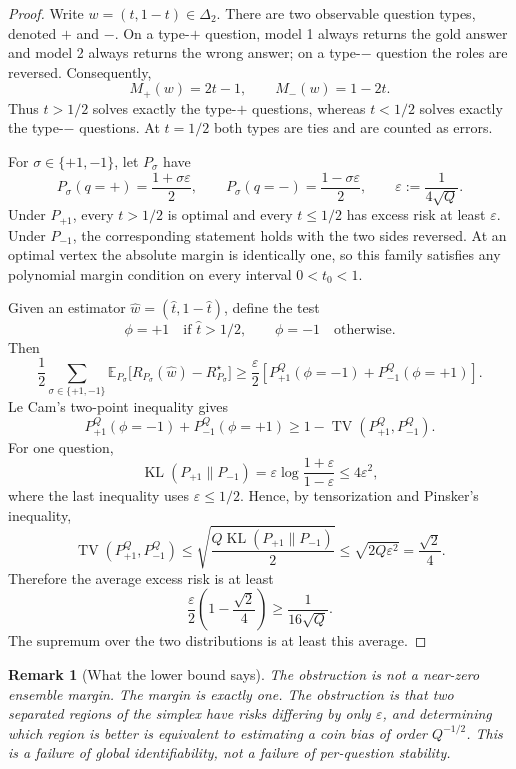 \documentclass[11pt]{article}
\newtheorem{remark}{Remark}
\newcommand{\E}{\mathbb E}
\begin{document}
\begin{proof}
Write $w=(t,1-t)\in\Delta_2$.  There are two observable question types, denoted $+$ and $-$.  On a type-$+$ question, model 1 always returns the gold answer and model 2 always returns the wrong answer; on a type-$-$ question the roles are reversed.  Consequently,
\[
M_+(w)=2t-1,
\qquad
M_-(w)=1-2t.
\]
Thus $t>1/2$ solves exactly the type-$+$ questions, whereas $t<1/2$ solves exactly the type-$-$ questions.  At $t=1/2$ both types are ties and are counted as errors.

For $\sigma\in\{+1,-1\}$, let $P_\sigma$ have
\[
P_\sigma(q=+)=\frac{1+\sigma\varepsilon}{2},
\qquad
P_\sigma(q=-)=\frac{1-\sigma\varepsilon}{2},
\qquad
\varepsilon:=\frac{1}{4\sqrt Q}.
\]
Under $P_{+1}$, every $t>1/2$ is optimal and every $t\le1/2$ has excess risk at least $\varepsilon$.  Under $P_{-1}$, the corresponding statement holds with the two sides reversed.  At an optimal vertex the absolute margin is identically one, so this family satisfies any polynomial margin condition on every interval $0<t_0<1$.

Given an estimator $\widehat w=(\widehat t,1-\widehat t)$, define the test
\[
\phi=+1\quad\text{if }\widehat t>1/2,
\qquad
\phi=-1\quad\text{otherwise}.
\]
Then
\[
\frac12\sum_{\sigma\in\{+1,-1\}}
\E_{P_\sigma}\big[R_{P_\sigma}(\widehat w)-R_{P_\sigma}^\star\big]
\ge
\frac{\varepsilon}{2}
\left
[
P_{+1}^{Q}(\phi=-1)+P_{-1}^{Q}(\phi=+1)
\right].
\]
Le Cam's two-point inequality gives
\[
P_{+1}^{Q}(\phi=-1)+P_{-1}^{Q}(\phi=+1)
\ge
1-\operatorname{TV}(P_{+1}^{Q},P_{-1}^{Q}).
\]
For one question,
\[
\operatorname{KL}(P_{+1}\|P_{-1})
=
\varepsilon\log\frac{1+\varepsilon}{1-\varepsilon}
\le 4\varepsilon^2,
\]
where the last inequality uses $\varepsilon\le1/2$.  Hence, by tensorization and Pinsker's inequality,
\[
\operatorname{TV}(P_{+1}^{Q},P_{-1}^{Q})
\le
\sqrt{\frac{Q\operatorname{KL}(P_{+1}\|P_{-1})}{2}}
\le
\sqrt{2Q\varepsilon^2}
=
\frac{\sqrt2}{4}.
\]
Therefore the average excess risk is at least
\[
\frac{\varepsilon}{2}\left(1-\frac{\sqrt2}{4}\right)
\ge
\frac{1}{16\sqrt Q}.
\]
The supremum over the two distributions is at least this average.
\end{proof}

\begin{remark}[What the lower bound says]
The obstruction is not a near-zero ensemble margin.  The margin is exactly one.  The obstruction is that two separated regions of the simplex have risks differing by only $\varepsilon$, and determining which region is better is equivalent to estimating a coin bias of order $Q^{-1/2}$.  This is a failure of global identifiability, not a failure of per-question stability.
\end{remark}
\end{document}
